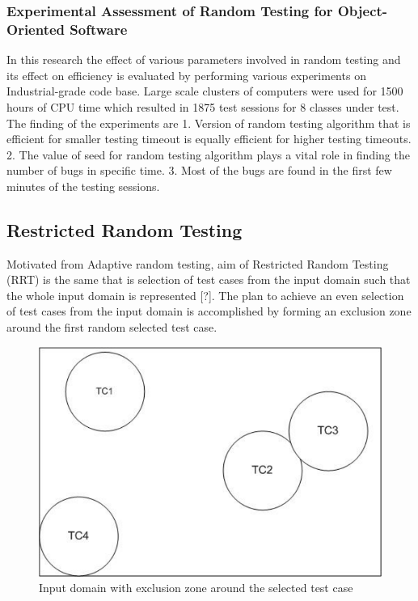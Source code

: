 \subsubsection{Experimental Assessment of Random Testing for Object-Oriented Software}
In this research the effect of various parameters involved in random testing and its effect on efficiency is evaluated by performing various experiments on Industrial-grade code base.
Large scale clusters of computers were used for 1500 hours of CPU time which resulted in 1875 test sessions for 8 classes under test. \cite{Ciupa2007} The finding of the experiments are
1. Version of random testing algorithm that is efficient for smaller testing timeout is equally efficient for higher testing timeouts.
2. The value of seed for random testing algorithm plays a vital role in finding the number of bugs in specific time.
3. Most of the bugs are found in the first few minutes of the testing sessions.


\subsection{Restricted Random Testing}
Motivated from Adaptive random testing, aim of Restricted Random Testing (RRT) is the same that is selection of test cases from the input domain such that the whole input domain is represented [?]. The plan to achieve an even selection of test cases from the input domain is accomplished by forming an exclusion zone around the first random selected test case.

\begin{figure}[h]
	\centering
	\includegraphics[scale=0.5]{Literature/RRT}
	\caption{Input domain with exclusion zone around the selected test case}
\end{figure}

